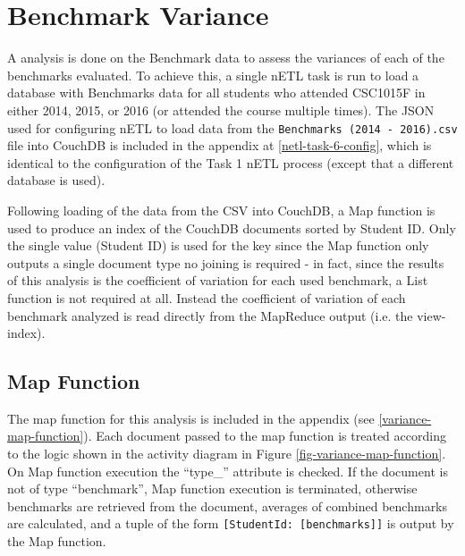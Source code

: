 \section{Benchmark Variance}
A  analysis is done on the Benchmark data to assess the variances of each of the benchmarks evaluated. To achieve this, a single nETL task is run to load a database with Benchmarks data for all students who attended CSC1015F in either 2014, 2015, or 2016 (or attended the course multiple times). The JSON used for configuring nETL to load data from the \texttt{Benchmarks (2014 - 2016).csv} file into CouchDB is included in the appendix at \ref{netl-task-6-config}, which is identical to the configuration of the Task 1 nETL process (except that a different database is used).

Following loading of the data from the CSV into CouchDB, a Map function is used to produce an index of the CouchDB documents sorted by Student ID. Only the single value (Student ID) is used for the key since the Map function only outputs a single document type no joining is required - in fact, since the results of this analysis is the coefficient of variation for each used benchmark, a List function is not required at all. Instead the coefficient of variation of each benchmark analyzed is read directly from the MapReduce output (i.e. the view-index).

\subsection{Map Function}
The map function for this analysis is included in the appendix (see \ref{variance-map-function}). Each document passed to the map function is treated according to the logic shown in the activity diagram in Figure \ref{fig-variance-map-function}. On Map function execution the ``type\_'' attribute is checked. If the document is not of type ``benchmark'', Map function execution is terminated, otherwise benchmarks are retrieved from the document, averages of combined benchmarks are calculated, and a tuple of the form \texttt{[StudentId: [benchmarks]]} is output by the Map function.


